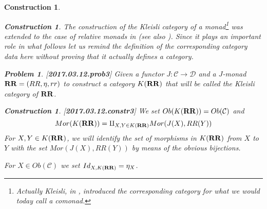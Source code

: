 \documentclass[12pt]{amsart}
\newtheorem{problem}[proposition]{Problem}
\newtheorem{construction}[proposition]{Construction}
\newcommand{\llabel}[1]{\label{#1}[{\bf #1}]}
\newcommand{\sr}{\rightarrow}
\newcommand{\RR}{{\bf RR}}
\newcommand{\C}{{\mathcal C}}
\newcommand{\D}{{\mathcal D}}
\begin{document}
\begin{construction}
\begin{construction}
The construction of the Kleisli category of a monad\footnote{Actually Kleisli, in \cite{Kleisli}, introduced the corresponding category for what we would today call a comonad.} was extended to the case of relative monads in \cite[p.8]{ACU2} (see also \cite[Constr. 2.9]{LandJf}). Since it plays an important role in what follows let us remind  the definition of the corresponding category data here without proving that it actually defines a category.
%
\begin{problem}
\llabel{2017.03.12.prob3}
Given a functor $J:\C\sr\D$ and a $J$-monad $\RR=(RR,\eta,rr)$ to construct a category $K(\RR)$ that will be called the Kleisli category of $\RR$.
\end{problem}
%
\begin{construction}\rm
\llabel{2017.03.12.constr3}
We set $Ob(K(\RR))=Ob(\C)$ and 
%
$$Mor(K(\RR))=\amalg_{X,Y\in K(\RR)}Mor(J(X),RR(Y))$$
%
For $X,Y\in K(\RR)$, we will identify the set of morphisms in $K(\RR)$ from $X$ to $Y$ with the set $Mor(J(X),RR(Y))$ by means of the obvious bijections. 

For $X\in Ob(\C)$ we set $Id_{X,K(\RR)}=\eta_{X}$.


\end{construction}
\end{construction}
\end{construction}
\end{document}
